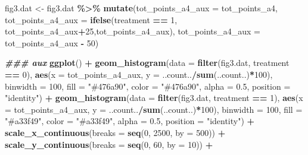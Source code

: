 \documentclass[
]{article}
\newenvironment{Shaded}{\begin{snugshade}}{\end{snugshade}}
\newcommand{\AttributeTok}[1]{\textcolor[rgb]{0.13,0.29,0.53}{#1}}
\newcommand{\DecValTok}[1]{\textcolor[rgb]{0.00,0.00,0.81}{#1}}
\newcommand{\DocumentationTok}[1]{\textcolor[rgb]{0.56,0.35,0.01}{\textbf{\textit{#1}}}}
\newcommand{\FloatTok}[1]{\textcolor[rgb]{0.00,0.00,0.81}{#1}}
\newcommand{\FunctionTok}[1]{\textcolor[rgb]{0.13,0.29,0.53}{\textbf{#1}}}
\newcommand{\NormalTok}[1]{#1}
\newcommand{\OtherTok}[1]{\textcolor[rgb]{0.56,0.35,0.01}{#1}}
\newcommand{\SpecialCharTok}[1]{\textcolor[rgb]{0.81,0.36,0.00}{\textbf{#1}}}
\newcommand{\StringTok}[1]{\textcolor[rgb]{0.31,0.60,0.02}{#1}}
\begin{document}
\begin{Shaded}
\begin{Highlighting}[]
\NormalTok{fig3.dat }\OtherTok{\textless{}{-}}\NormalTok{ fig3.dat }\SpecialCharTok{\%\textgreater{}\%}
  \FunctionTok{mutate}\NormalTok{(}\AttributeTok{tot\_points\_a4\_aux =}\NormalTok{ tot\_points\_a4,}
         \AttributeTok{tot\_points\_a4\_aux =} \FunctionTok{ifelse}\NormalTok{(treatment }\SpecialCharTok{==} \DecValTok{1}\NormalTok{, tot\_points\_a4\_aux}\SpecialCharTok{+}\DecValTok{25}\NormalTok{,tot\_points\_a4\_aux),}
         \AttributeTok{tot\_points\_a4\_aux =}\NormalTok{ tot\_points\_a4\_aux }\SpecialCharTok{{-}} \DecValTok{50}\NormalTok{)}

\DocumentationTok{\#\#\# aux}
\FunctionTok{ggplot}\NormalTok{() }\SpecialCharTok{+}
  \FunctionTok{geom\_histogram}\NormalTok{(}\AttributeTok{data =} \FunctionTok{filter}\NormalTok{(fig3.dat, treatment }\SpecialCharTok{==} \DecValTok{0}\NormalTok{),}
                 \FunctionTok{aes}\NormalTok{(}\AttributeTok{x =}\NormalTok{ tot\_points\_a4\_aux, }\AttributeTok{y =}\NormalTok{ ..count..}\SpecialCharTok{/}\FunctionTok{sum}\NormalTok{(..count..)}\SpecialCharTok{*}\DecValTok{100}\NormalTok{),}
                 \AttributeTok{binwidth =} \DecValTok{100}\NormalTok{, }\AttributeTok{fill =} \StringTok{"\#476a90"}\NormalTok{, }\AttributeTok{color =} \StringTok{"\#476a90"}\NormalTok{, }\AttributeTok{alpha =} \FloatTok{0.5}\NormalTok{, }\AttributeTok{position =} \StringTok{"identity"}\NormalTok{) }\SpecialCharTok{+}
  \FunctionTok{geom\_histogram}\NormalTok{(}\AttributeTok{data =} \FunctionTok{filter}\NormalTok{(fig3.dat, treatment }\SpecialCharTok{==} \DecValTok{1}\NormalTok{),}
                 \FunctionTok{aes}\NormalTok{(}\AttributeTok{x =}\NormalTok{ tot\_points\_a4\_aux, }\AttributeTok{y =}\NormalTok{ ..count..}\SpecialCharTok{/}\FunctionTok{sum}\NormalTok{(..count..)}\SpecialCharTok{*}\DecValTok{100}\NormalTok{),}
                 \AttributeTok{binwidth =} \DecValTok{100}\NormalTok{, }\AttributeTok{fill =} \StringTok{"\#a33f49"}\NormalTok{, }\AttributeTok{color =} \StringTok{"\#a33f49"}\NormalTok{, }\AttributeTok{alpha =} \FloatTok{0.5}\NormalTok{, }\AttributeTok{position =} \StringTok{"identity"}\NormalTok{) }\SpecialCharTok{+}
  \FunctionTok{scale\_x\_continuous}\NormalTok{(}\AttributeTok{breaks =} \FunctionTok{seq}\NormalTok{(}\DecValTok{0}\NormalTok{, }\DecValTok{2500}\NormalTok{, }\AttributeTok{by =} \DecValTok{500}\NormalTok{)) }\SpecialCharTok{+}
  \FunctionTok{scale\_y\_continuous}\NormalTok{(}\AttributeTok{breaks =} \FunctionTok{seq}\NormalTok{(}\DecValTok{0}\NormalTok{, }\DecValTok{60}\NormalTok{, }\AttributeTok{by =} \DecValTok{10}\NormalTok{)) }\SpecialCharTok{+}

\end{Highlighting}
\end{Shaded}
\end{document}
